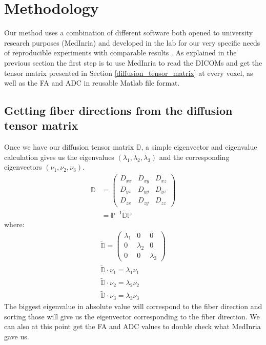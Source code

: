 \chapter{Methodology}

Our method uses a combination of different software both opened to university research purposes (MedInria) and developed in the lab for our very specific needs of reproducible experiments with comparable results \cite{piuzephd}. As explained in the previous section the first step is to use MedInria to read the DICOMs and get the tensor matrix presented in Section \ref{diffusion_tensor_matrix} at every voxel, as well as the FA and ADC in reusable Matlab file format.

\section{Getting fiber directions from the diffusion tensor matrix}

Once we have our diffusion tensor matrix $\mathbb{D}$, a simple eigenvector and eigenvalue calculation gives us the eigenvalues $(\lambda_1, \lambda_2, \lambda_3)$ and the corresponding eigenvectors $(\nu_1, \nu_2, \nu_3)$.
\begin{align}
    \mathbb{D} &= \begin{pmatrix}
        D_{xx} & D_{xy} & D_{xz} \\
        D_{yx} & D_{yy} & D_{yz} \\
        D_{zx} & D_{zy} & D_{zz}
        \end{pmatrix} \\
    &= \mathbb{P}^{-1} \mathbb{\tilde{D}P}
\end{align}
where:
\begin{gather*}
    \mathbb{\tilde{D}} = \begin{pmatrix}
        \lambda_1 & 0 & 0 \\
        0 & \lambda_2 & 0 \\
        0 & 0 & \lambda_3
        \end{pmatrix} \\
    \mathbb{\tilde{D}}\cdot \nu_1 = \lambda_1 \nu_1 \\
    \mathbb{\tilde{D}}\cdot \nu_2 = \lambda_2 \nu_2 \\
    \mathbb{\tilde{D}}\cdot \nu_3 = \lambda_3 \nu_3
\end{gather*}
The biggest eigenvalue in absolute value will correspond to the fiber direction and sorting those will give us the eigenvector corresponding to the fiber direction. We can also at this point get the FA and ADC values to double check what MedInria gave us.

